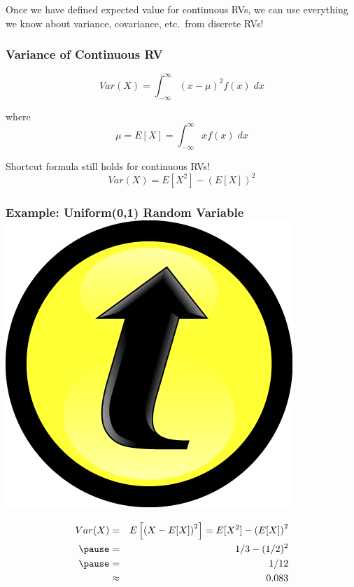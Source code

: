 \documentclass[handout]{beamer}
\begin{document}
\begin{frame}
Once we have defined expected value for continuous RVs, we can use everything we know about variance, covariance, etc.\ from discrete RVs!
\end{frame}

\begin{frame}
\frametitle{Variance of Continuous RV}

$$\boxed{Var(X) = \int_{-\infty}^{\infty} (x - \mu)^2 f(x) \; dx}$$

\vspace{2em}
where
$$\mu = E[X]=\int_{-\infty}^\infty x f(x) \; dx $$

\vspace{2em}
\alert{Shortcut formula still holds for continuous RVs!}
	$$Var(X) = E[X^2] - \left(E[X]\right)^2$$
\end{frame}

\begin{frame}
\frametitle{Example: Uniform(0,1) Random Variable \hfill \includegraphics[scale = 0.05]{./images/clicker}}
\begin{eqnarray*}
 Var(X) &=& E\left[ \left( X - E[X] \right)^2\right] = E[X^2] - \left(E[X]\right)^2\\ \pause
 	&=& 1/3  - (1/2)^2\\ \pause
 	&=& 1/12 \\
 	&\approx& 0.083
\end{eqnarray*}
\end{frame}
\end{document}
